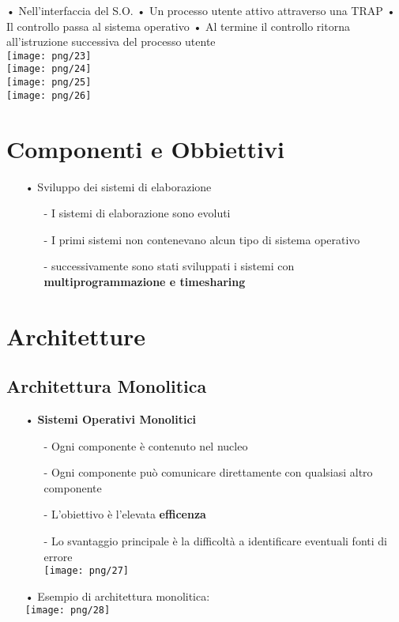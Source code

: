 \documentclass[12pt, letterpaper]{article}
\begin{document}
• Nell'interfaccia del S.O.
• Un processo utente attivo attraverso una TRAP 
• Il controllo passa al sistema operativo 
• Al termine il controllo ritorna all'istruzione successiva del processo utente 
\\
\texttt{[image: png/23]}
\\
\texttt{[image: png/24]}
\\
\texttt{[image: png/25]}
\\
\texttt{[image: png/26]}

\section{Componenti e Obbiettivi}

\begin{itemize}
   \item[•] Sviluppo dei sistemi di elaborazione 
      \begin{itemize}
         \item[-] I sistemi di elaborazione sono evoluti 
         \item[-] I primi sistemi non contenevano alcun tipo di sistema operativo 
         \item[-] successivamente sono stati sviluppati i sistemi con \textbf{multiprogrammazione e timesharing}
      \end{itemize}
\end{itemize}

\section{Architetture}
\subsection{Architettura Monolitica}
\begin{itemize}
   \item[•] \textbf{Sistemi Operativi Monolitici}
      \begin{itemize}
         \item[-] Ogni componente è contenuto nel nucleo 
         \item[-] Ogni componente può comunicare direttamente con qualsiasi altro componente 
         \item[-] L'obiettivo è l'elevata \textbf{efficenza}
         \item[-] Lo svantaggio principale è la difficoltà a identificare eventuali fonti di errore
         \\\texttt{[image: png/27]}
      \end{itemize}
   \item[•] Esempio di architettura monolitica:
      \\\texttt{[image: png/28]}
\end{itemize}
\end{document}
